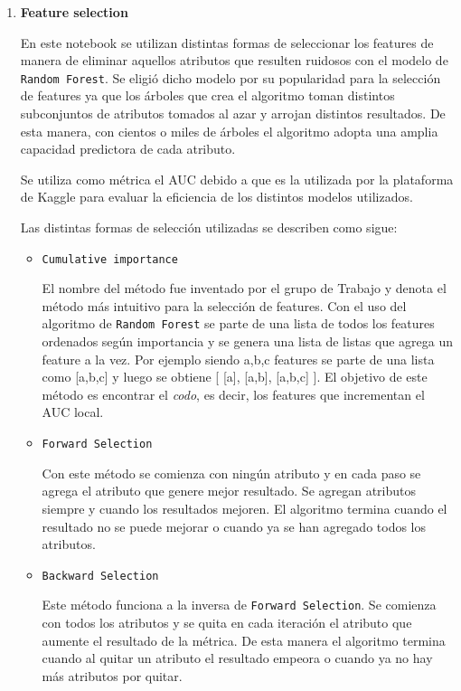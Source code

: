 \documentclass[a4paper]{article}
\begin{document}
\begin{enumerate}
\item \textbf{Feature selection}

En este notebook se utilizan distintas formas de seleccionar los features de manera de eliminar aquellos atributos que resulten ruidosos con el modelo de \texttt{Random Forest}. Se eligió dicho modelo por su popularidad para la selección de features ya que los árboles que crea el algoritmo toman distintos subconjuntos de atributos tomados al azar y arrojan distintos resultados. De esta manera, con cientos o miles de árboles el algoritmo adopta una amplia capacidad predictora de cada atributo.

Se utiliza como métrica el AUC debido a que es la utilizada por la plataforma de Kaggle para evaluar la eficiencia de los distintos modelos utilizados. 

Las distintas formas de selección utilizadas se describen como sigue:

\begin {itemize}
\item \texttt{Cumulative importance}

El nombre del método fue inventado por el grupo de Trabajo y denota el método más intuitivo para la selección de features. Con el uso del algoritmo de \texttt{Random Forest} se parte de una lista de todos los features ordenados según importancia y se genera una lista de listas que agrega un feature a la vez. Por ejemplo siendo a,b,c features se parte de una lista como [a,b,c] y luego se obtiene  [ [a], [a,b], [a,b,c] ]. El objetivo de este método es encontrar el 
\textit{codo}, es decir, los features que incrementan el AUC local.

\item \texttt{Forward Selection}

Con este método se comienza con ningún atributo y en cada paso se agrega el atributo que genere mejor resultado. Se agregan atributos siempre y cuando los resultados mejoren. El algoritmo termina cuando el resultado no se puede mejorar o cuando ya se han agregado todos los atributos.

\item \texttt{Backward Selection}

Este método funciona a la inversa de \texttt{Forward Selection}. Se comienza con todos los atributos y se quita en cada iteración el atributo que aumente el resultado de la métrica. De esta manera el algoritmo termina cuando al quitar un atributo el resultado empeora o cuando ya no hay más atributos por quitar.


\end{itemize}
\end{enumerate}
\end{document}
